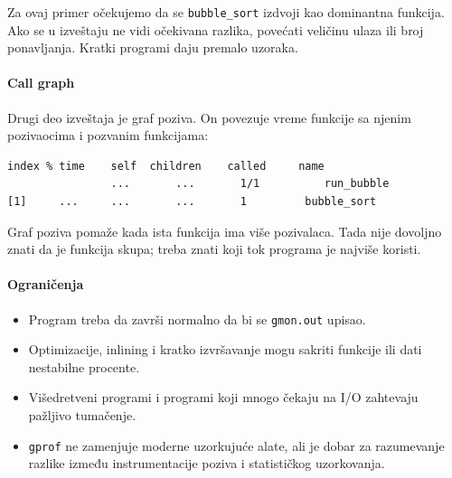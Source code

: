 Za ovaj primer očekujemo da se \texttt{bubble\_sort} izdvoji kao dominantna funkcija. Ako se u izveštaju ne vidi očekivana razlika, povećati veličinu ulaza ili broj ponavljanja. Kratki programi daju premalo uzoraka.

\paragraph{Call graph}\label{gprof-call-graph}

Drugi deo izveštaja je graf poziva. On povezuje vreme funkcije sa njenim pozivaocima i pozvanim funkcijama:

\begin{verbatim}
index % time    self  children    called     name
                ...       ...       1/1          run_bubble
[1]     ...     ...       ...       1         bubble_sort
\end{verbatim}

Graf poziva pomaže kada ista funkcija ima više pozivalaca. Tada nije dovoljno znati da je funkcija skupa; treba znati koji tok programa je najviše koristi.

\paragraph{Ograničenja}\label{gprof-ogranicenja}

\begin{itemize}
\tightlist
\item
  Program treba da završi normalno da bi se \texttt{gmon.out} upisao.
\item
  Optimizacije, inlining i kratko izvršavanje mogu sakriti funkcije ili dati nestabilne procente.
\item
  Višedretveni programi i programi koji mnogo čekaju na I/O zahtevaju pažljivo tumačenje.
\item
  \texttt{gprof} ne zamenjuje moderne uzorkujuće alate, ali je dobar za razumevanje razlike između instrumentacije poziva i statističkog uzorkovanja.
\end{itemize}
